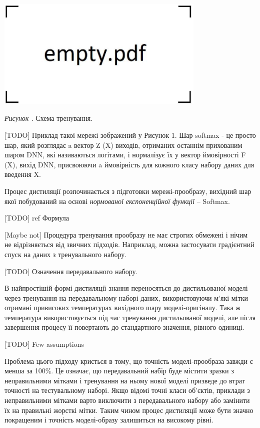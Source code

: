 \documentclass[14pt,a4paper]{extarticle}
\newcounter{e}
\newcounter{pic}
\newcommand{\pic}[1]{\refstepcounter{pic} \vspace{-0.3cm}\textit{Рисунок \arabic{pic}\label{#1}.}}
\numberwithin{equation}{section}
\numberwithin{figure}{section}
\begin{document}
 \begin{center}
 	\includegraphics[width=10cm]{../images/empty.pdf}
 \end{center}
  \begin{center}
 	\pic{distilation} Схема тренування.
 	
 	[TODO]
 	 Приклад такої мережі зображений у
 	Рисунок 1. Шар softmax - це просто шар, який розглядає a
 	вектор Z (X) виходів, отриманих останнім прихованим шаром
 	DNN, які називаються логітами, і нормалізує їх у
 	вектор ймовірності F (X), вихід DNN, присвоюючи a
 	ймовірність для кожного класу набору даних для введення X.
 	
 \end{center}
 
 Процес дистиляції розпочинається з підготовки мережі-прообразу, вихідний шар якої побудований на основі \textit{нормованої експоненційної функції} -- Softmax.
 
 [TODO] ref Формула
 
 [Maybe not] Процедура тренування прообразу не має строгих обмежені і нічим не відрізняється від звичних підходів. Наприклад, можна застосувати градієнтний спуск на даних з тренувального набору.
 

 [TODO] Означення передавального набору.


 В найпростішій формі дистиляції знання переносяться до дистильованої моделі через тренування на передавальному наборі даних, використовуючи м'які мітки отримані привисоких температурах вихідного шару моделі-оригіналу. Така ж температура використовується під час тренування дистильованої моделі, але після завершення процесу її повертають до стандартного значення, рівного одиниці.
 
 [TODO] Few assumptions

 Проблема цього підходу криється в тому, що точність моделі-прообраза завжди є менша за 100\%. Це означає, що передавальний набір буде містити зразки з неправильними мітками і тренування на ньому нової моделі призведе до втрат точності на тестувальному наборі. Якщо відомі точні класи об'єктів, приклади з неправильними мітками варто виключити з передавального набору або замінити їх на правильні жорсткі мітки. Таким чином процес дистиляції може бути значно покращеним і точність моделі-образу залишиться на високому рівні.
 
\end{document}
